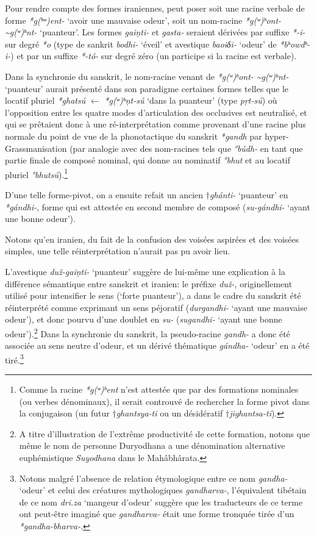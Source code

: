\documentclass[11pt]{article}
\newcommand{\ipa}[1]{{\phon\textit{#1}}}
\begin{document}
Pour rendre compte des formes iraniennes, peut poser soit une racine verbale de forme \ipa{*g(ʰʷ)ent-} `avoir une mauvaise odeur', soit un nom-racine  \ipa{*g(ʷ)ʰont- \textasciitilde *g(ʷ)ʰnt-} `puanteur'. Les formes \ipa{gaiṇti-} et  \ipa{gasta-} seraient dérivées par suffixe \ipa{*-i-} sur degré \ipa{*o} (type de sankrit \ipa{bodhi-} `éveil' et avestique \ipa{baoiδi-} `odeur' de \ipa{*bʰowdʰ-i-}) et par un suffixe \ipa{*-tó-} sur degré zéro (un participe si la racine est verbale).

Dans la synchronie du sanskrit, le nom-racine venant de \ipa{*g(ʷ)ʰont- \textasciitilde *g(ʷ)ʰnt-} `puanteur' aurait présenté dans son paradigme certaines formes telles que le locatif pluriel \ipa{*ghatsú} $\leftarrow$ \ipa{*g(ʷ)ʰṇt-sú} `dans la puanteur' (type \ipa{pṛt-sú}) où l'opposition entre les quatre modes d'articulation des occlusives est neutralisé, et qui se prêtaient donc à une ré-interprétation comme provenant d'une racine plus normale du point de vue de la phonotactique du sanskrit \ipa{*gandh} par hyper-Grassmanisation (par analogie avec des nom-racines tels que \ipa{°búdh-} en tant que partie finale de composé nominal, qui donne au nominatif \ipa{°bhut} et au locatif pluriel \ipa{°bhutsú}).\footnote{Comme la racine \ipa{*g(ʷ)ʰent} n'est attestée que par des formations nominales (ou verbes dénominaux), il serait controuvé de rechercher la forme pivot dans la conjugaison (un futur $\dagger$\ipa{ghantsya-ti} ou un désidératif $\dagger$\ipa{jighantsa-ti}). }

D'une telle forme-pivot, on a ensuite refait un ancien $\dagger$\ipa{ghánti-} `puanteur' en \ipa{*gándhi-}, forme qui est attestée en second membre de composé (\ipa{su-gándhi-} `ayant une bonne odeur').

Notons qu'en iranien, du fait de la confusion des voisées aspirées et des voisées simples, une telle réinterprétation n'aurait pas pu avoir lieu.

L'avestique \ipa{duž-gaiṇti-} `puanteur' suggère de lui-même une explication à la différence sémantique entre sanskrit et iranien: le préfixe \ipa{duž-}, originellement utilisé pour intensifier le sens (`forte puanteur'), a dans le cadre du sanskrit été réinterprété comme exprimant un sens péjoratif (\ipa{durgandhi-} `ayant une mauvaise odeur'), et donc pourvu d'une doublet en \ipa{su-} (\ipa{sugandhi-} `ayant une bonne odeur').\footnote{A titre d'illustration de l'extrême productivité de cette formation, notons que même le nom de personne Duryodhana a  une dénomination alternative euphémistique \textit{Suyodhana} dans le Mahâbhârata.} Dans la synchronie du sanskrit, la pseudo-racine \ipa{gandh-} a donc été associée au sens neutre d'odeur, et un dérivé thématique \ipa{gándha-} `odeur' en a été tiré.\footnote{Notons malgré l'absence de relation étymologique entre ce nom \ipa{gandha-} `odeur' et celui des créatures mythologiques \ipa{gandharva-}, l'équivalent tibétain de ce nom \ipa{dri.za} `mangeur d'odeur' suggère que les traducteurs de ce terme ont peut-être imaginé que \ipa{gandharva-} était une forme tronquée tirée d'un \ipa{*gandha-bharva-}.}
\end{document}
